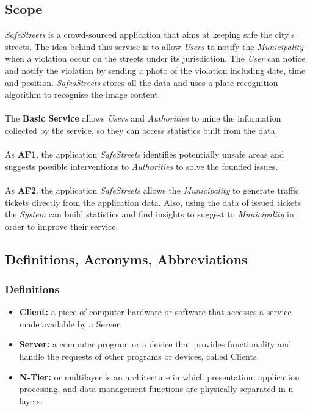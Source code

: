 \documentclass{article}
\begin{document}
	\subsection{Scope}
	{\it SafeStreets} is a crowd-sourced application that aims at keeping safe the city's streets. The idea behind this service is to allow {\it Users} to notify the {\it Municipality} when a violation occur on the streets under its jurisdiction. The {\it User} can notice and notify the violation by sending a photo of the violation including date, time and position. {\it SafesStreets} stores all the data and uses a plate recognition algorithm to recognise the image content. \\ \\
	The {\bf Basic Service} allows {\it Users} and {\it Authorities} to mine the information \mbox{collected} by the service, so they can access statistics built from the data. \\ \\
	As {\bf AF1}, the application {\it SafeStreets} identifies potentially unsafe areas and \mbox{suggests} possible interventions to {\it Authorities} to solve the founded issues. \\ \\ 
	As {\bf AF2}. the application {\it SafeStreets} allows the {\it Municipality} to generate \mbox{traffic} tickets directly from the application data. Also, using the data of issued tickets the {\it System} can build statistics and find insights to suggest to {\it Municipality} in order to improve their service.
		
	\subsection{Definitions, Acronyms, Abbreviations}
		\subsubsection{Definitions}
			\begin{itemize}
				\item {\bf Client:} a piece of computer hardware or software that accesses a service made available by a Server. 
				\item {\bf Server:} a computer program or a device that provides functionality and handle the requests of other programs or devices, called Clients. 
				\item {\bf N-Tier:} or multilayer is an architecture in which presentation, application processing, and data management functions are physically separated in n-layers. 
			\end{itemize}
	
\end{document}
